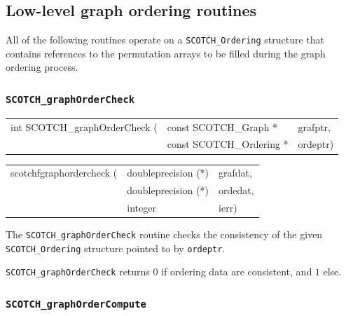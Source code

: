 \subsection{Low-level graph ordering routines}

All of the following routines operate on a {\tt SCOTCH\_\lbt Ordering}
structure that contains references to the permutation arrays to be
filled during the graph ordering process.

\subsubsection{{\tt SCOTCH\_graphOrderCheck}}

\begin{itemize}
\progsyn

{\tt\begin{tabular}{l@{}ll}
int SCOTCH\_graphOrderCheck ( & const SCOTCH\_Graph *    & grafptr, \\
                              & const SCOTCH\_Ordering * & ordeptr)
\end{tabular}}

{\tt\begin{tabular}{l@{}ll}
scotchfgraphordercheck ( & doubleprecision (*) & grafdat, \\
                         & doubleprecision (*) & ordedat, \\
                         & integer             & ierr)
\end{tabular}}

\progdes

The {\tt SCOTCH\_graphOrderCheck} routine checks the consistency of
the given {\tt SCOTCH\_\lbt Ordering} structure pointed to by {\tt ordeptr}.

\progret

{\tt SCOTCH\_graphOrderCheck} returns $0$ if ordering data are consistent, and
$1$ else.

\end{itemize}

\subsubsection{{\tt SCOTCH\_graphOrderCompute}}

